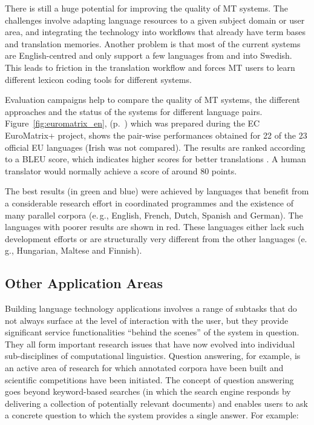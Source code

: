 \begin{multicols}{2}
There is still a huge potential for improving the quality of MT systems. The challenges involve adapting language resources to a given subject domain or user area, and integrating the technology into workflows that already have term bases and translation memories. Another problem is that most of the current systems are English-centred and only support a few languages from and into Swedish. This leads to friction in the translation workflow and forces MT users to learn different lexicon coding tools for different systems.

Evaluation campaigns help to compare the quality of MT systems, the
different approaches and the status of the systems for different
language pairs. Figure~\ref{fig:euromatrix_en}, (p.~\pageref{fig:euromatrix_sv})
which was prepared during the EC
EuroMatrix+ project, shows the pair-wise performances obtained for
22 of the 23 official EU languages (Irish was not compared). The
results are ranked according to a BLEU score, which indicates higher
scores for better translations \cite{bleu1}. A human translator would
normally achieve a score of around 80 points.

The best results (in green and blue) were achieved by languages that
benefit from a considerable research effort in coordinated programmes
and the existence of many parallel corpora (e.\,g., English, French,
Dutch, Spanish and German). The languages with poorer results are
shown in red. These languages either lack such development efforts or
are structurally very different from the other languages (e.\,g.,
Hungarian, Maltese and Finnish).

\subsection{Other Application Areas}

Building language technology applications involves a range of subtasks that do not always surface at the level of interaction with the user, but they provide significant service functionalities “behind the scenes” of the system in question. They all form important research issues that have now evolved into individual sub-disciplines of computational linguistics.  Question answering, for example, is an active area of research for which annotated corpora have been built and scientific competitions have been initiated. The concept of question answering goes beyond keyword-based searches (in which the search engine responds by delivering a collection of potentially relevant documents) and enables users to ask a concrete question to which the system provides a single answer. For example:


\end{multicols}
